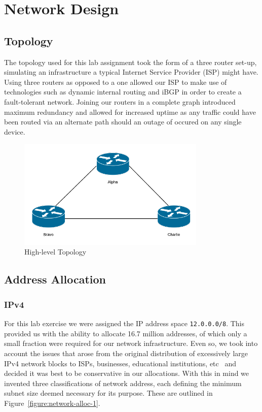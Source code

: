 \chapter{Network Design}

\section{Topology}

The topology used for this lab assignment took the form of a three router set-up,
simulating an infrastructure a typical Internet Service Provider (ISP)
might have. Using three routers as opposed to a one allowed our ISP to make
use of technologies such as dynamic internal routing and iBGP in order to
create a fault-tolerant network. Joining our routers in a complete graph
introduced maximum redundancy and allowed for increased uptime as any traffic
could have been routed via an alternate path should an outage of occured on any single
device.

\begin{figure}[!ht]
    \caption{High-level Topology}
    \centering
    \includegraphics[width=0.8\textwidth]{images/networkTopology.png}
\end{figure}

\section{Address Allocation}
\subsection{IPv4}
For this lab exercise we were assigned the IP address space
\texttt{12.0.0.0/8}. This provided us with the ability to allocate 16.7 million
addresses, of which only a small fraction were required for our network
infrastructure. Even so, we took into account the issues that arose from the
original distribution of excessively large IPv4 network blocks to ISPs,
businesses, educational institutions, etc~\cite{ipv4alloc}\cite{internetmap}
and decided it was best to be conservative in our allocations. With this in
mind we invented three classifications of network address, each defining the
minimum subnet size deemed necessary for its purpose. These are outlined in
Figure~\ref{figure:network-alloc-1}.

